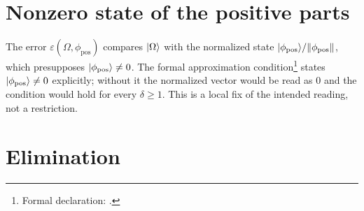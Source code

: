 \documentclass{article}
\begin{document}
\section{Nonzero state of the positive parts}
The error $\varepsilon(\Omega,\phi_{\mathrm{pos}})$ compares $|\Omega\rangle$ with
the normalized state $|\phi_{\mathrm{pos}}\rangle/\lVert\phi_{\mathrm{pos}}\rVert$,
which presupposes $|\phi_{\mathrm{pos}}\rangle\neq0$. The formal approximation
condition\footnote{Formal declaration:
    .}
states $|\phi_{\mathrm{pos}}\rangle\neq0$ explicitly; without it the normalized
vector would be read as $0$ and the condition would hold for every
$\delta\ge1$. This is a local fix of the intended reading, not a restriction.

\section{Elimination}
\end{document}

